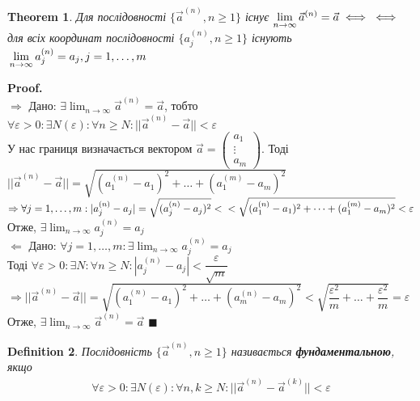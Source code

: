 \documentclass[a4paper, 14pt]{extarticle}
\def\huge{\displaystyle}
\def\bigline{\vspace{5mm}\\}
\def\rightproof{$\boxed{\Rightarrow}$ }
\def\leftproof{$\boxed{\Leftarrow}$ }
\theoremstyle{theoremdd}
\newtheorem{theorem}{Theorem}[subsection]
\theoremstyle{theoremdd}
\newtheorem{definition}[theorem]{Definition}
\theoremstyle{theoremdd}
\theoremstyle{theoremdd}
\theoremstyle{theoremdd}
\theoremstyle{theoremdd}
\theoremstyle{theoremdd}
\newenvironment{pf}{\vspace*{-3mm} \textbf{Proof. \\}}{$\blacksquare$}
\begin{document}
\begin{theorem}
Для послідовності $\{\vec{a}^{(n)}, n \geq 1 \}$ існує $\huge \lim_{n \to \infty} \vec{a}^{(n)} = \vec{a} \iff \\ \iff$ для всіх координат послідовності $\{a_j^{(n)}, n \geq 1\}$ існують $\\ \huge \lim_{n \to \infty} a_j^{(n)} = a_j, j = 1,\dots,m$
\end{theorem}
\begin{pf}
\rightproof Дано: $\exists \huge \lim_{n \to \infty} \vec{a}^{(n)} = \vec{a}$, тобто\\
$\huge \forall \varepsilon > 0: \exists N(\varepsilon): \forall n \geq N: ||\vec{a}^{(n)} - \vec{a}|| < \varepsilon$\\
У нас границя визначається вектором $\vec{a} = \begin{pmatrix}
a_1 \\ \vdots \\ a_m
\end{pmatrix}$. Тоді\\
$||\vec{a}^{(n)} - \vec{a}|| = \sqrt{(a_1^{(n)} - a_1)^2 + \dots + (a_1^{(m)} - a_m)^2}$\\
$\Rightarrow \forall j = 1, \dots, m: |a_j^{(n)} - a_j| = \sqrt{(a_j^{(n)} - a_j)^2} < \\ < \sqrt{(a_1^{(n)} - a_1)^2 + \dots + (a_1^{(m)} - a_m)^2} < \varepsilon$\\
Отже, $\exists \huge \lim_{n \to \infty} a_j^{(n)} = a_j$
\bigline
\leftproof Дано: $\forall j = 1,\dots, m: \exists \huge \lim_{n \to \infty} a_j^{(n)} = a_j$\\
Тоді $\forall \varepsilon > 0: \exists N: \forall n \geq N: |a_j^{(n)} - a_j| < \dfrac{\varepsilon}{\sqrt{m}}$\\
$\Rightarrow ||\vec{a}^{(n)} - \vec{a}|| = \sqrt{(a_1^{(n)} - a_1)^2 + \dots + (a_m^{(n)} - a_m)^2} < \sqrt{\dfrac{\varepsilon^2}{m} + \dots + \dfrac{\varepsilon^2}{m}} = \varepsilon$\\
Отже, $\exists \huge \lim_{n \to \infty} \vec{a}^{(n)} = \vec{a}$
\end{pf}

\begin{definition}
Послідовність $\{\vec{a}^{(n)}, n \geq 1 \}$ називається \textbf{фундаментальною}, якщо
\begin{align*}
\forall \varepsilon > 0: \exists N(\varepsilon): \forall n, k \geq N: ||\vec{a}^{(n)} - \vec{a}^{(k)}|| < \varepsilon
\end{align*}
\end{definition}
\end{document}
